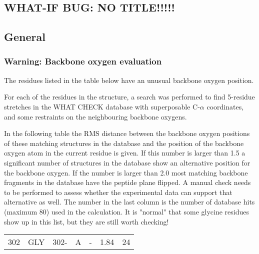 \documentclass[a4paper]{article}
\def\showsect#1{
  \thesect\gdef\thesect{}
  \thessect\gdef\thessect{}
  \subsubsection{#1}
}
\gdef\thesect{\pagebreak[2]\section{WHAT-IF BUG: NO TITLE!!!!!}}
\gdef\thessect{\subsection{General}}
\begin{document}
\begin{warning}
\showsect{Warning: Backbone oxygen evaluation}
The residues listed in the table below have an unusual backbone oxygen
position.
 
For each of the residues in the structure, a search was performed to find
5-residue stretches in the WHAT CHECK database with superposable C-$\alpha$
coordinates, and some restraints on the neighbouring backbone oxygens.
 
In the following table the RMS distance between the backbone oxygen positions
of these matching structures in the database and the position of the backbone
oxygen atom in the current residue is given. If this number is larger than
1.5 a significant number of structures in the database show an alternative
position for the backbone oxygen. If the number is larger than 2.0 most
matching backbone fragments in the database have the peptide plane flipped.
A manual check needs to be performed to assess whether the experimental data
can support that alternative as well. The number in the last column is the
number of database hits (maximum 80) used in the calculation. It is "normal"
that some glycine residues show up in this list, but they are still worth
checking!
 
\begin{center}
 
\begin{supertabular}{rr@{ (}r@{) }rl@{ }r@{ }r}
  302&GLY & 302-&A &-& 1.84&  24\\
\end{supertabular}\end{center}
\end{warning}
\end{document}
